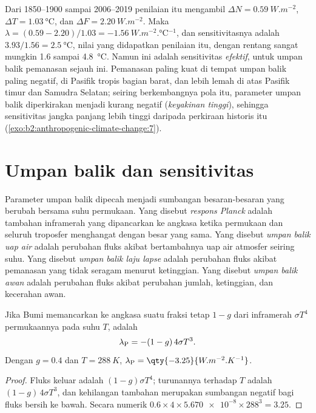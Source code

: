 Dari 1850--1900 sampai 2006--2019 penilaian itu mengambil $\Delta N = \qty{0.59}{W.m^{-2}}$, $\Delta T =
\qty{1.03}{\celsius}$, dan $\Delta F = \qty{2.20}{W.m^{-2}}$. Maka $\lambda = (0.59 - 2.20)/1.03 =
\qty{-1.56}{W.m^{-2}.\celsius^{-1}}$, dan sensitivitasnya adalah $3.93/1.56 = \qty{2.5}{\celsius}$,
nilai yang didapatkan penilaian itu, dengan rentang sangat mungkin 1.6 sampai \qty{4.8}{\celsius}. Namun ini adalah
sensitivitas \emph{efektif}, untuk umpan balik pemanasan sejauh ini. Pemanasan paling
kuat di tempat umpan balik paling negatif, di Pasifik tropis bagian barat, dan lebih lemah di atas
Pasifik timur dan Samudra Selatan; seiring berkembangnya pola itu, parameter umpan balik diperkirakan
menjadi kurang negatif (\emph{keyakinan tinggi}), sehingga sensitivitas jangka panjang lebih tinggi daripada
perkiraan historis itu (\cref{exo:b2:anthropogenic-climate-change:7}).

\section{Umpan balik dan sensitivitas}\label{sec:b2:anthropogenic-climate-change:feedbacks}

\begin{definition}\label{def:b2:anthropogenic-climate-change:feedbacks}
Parameter umpan balik dipecah menjadi sumbangan besaran-besaran yang berubah bersama
suhu permukaan. Yang disebut \emph{respons Planck} adalah tambahan inframerah
yang dipancarkan ke angkasa ketika permukaan dan seluruh troposfer menghangat dengan besar yang sama. Yang disebut
\emph{umpan balik uap air} adalah perubahan fluks akibat bertambahnya
uap air atmosfer seiring suhu. Yang disebut \emph{umpan balik laju lapse}
adalah perubahan fluks akibat pemanasan yang tidak seragam menurut ketinggian. Yang disebut \emph{umpan
balik awan} adalah perubahan fluks akibat perubahan jumlah, ketinggian, dan
kecerahan awan.
\end{definition}

\begin{proposition}\label{prop:b2:anthropogenic-climate-change:planck}
Jika Bumi memancarkan ke angkasa suatu fraksi tetap $1 - g$ dari inframerah $\sigma T^4$ permukaannya pada
suhu $T$,  adalah
\[
  \lambda_{\text P} = -(1 - g)\,4\sigma T^3 .
\]
Dengan $g = 0.4$ dan $T = \qty{288}{K}$, $\lambda_{\text P} = \qty{-3.25}{W.m^{-2}.K^{-1}}$.
\end{proposition}
\begin{proof}
Fluks keluar adalah $(1 - g)\sigma T^4$; turunannya terhadap $T$ adalah $(1 - g)\,4\sigma
T^3$, dan kehilangan tambahan merupakan sumbangan negatif bagi fluks bersih ke bawah. Secara numerik $0.6
\times 4 \times \num{5.670e-8} \times 288^3 = 3.25$.
\end{proof}


